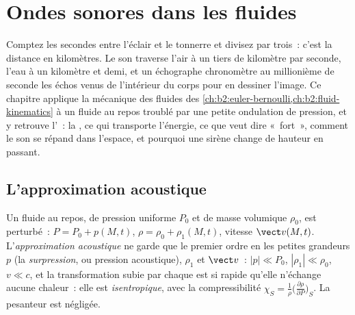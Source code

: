 \chapter{Ondes sonores dans les fluides}\label{ch:b2:sound-waves}

Comptez les secondes entre l'éclair et le tonnerre et divisez par
trois~: c'est la distance en kilomètres. Le son traverse l'air à un
tiers de kilomètre par seconde, l'eau à un kilomètre et demi, et
un échographe chronomètre au millionième de seconde les échos venus de l'intérieur du corps
pour en dessiner l'image. Ce chapitre applique la
mécanique des fluides des \cref{ch:b2:euler-bernoulli,ch:b2:fluid-kinematics}
à un fluide au repos troublé par une petite ondulation de pression, et y retrouve
l'~: la , ce qui transporte
l'énergie, ce que veut dire «~fort~», comment le son se répand dans l'espace, et pourquoi une sirène
change de hauteur en passant.

\section{L'approximation acoustique}

\begin{definition}\label{def:b2:sound-waves:approximation}
Un fluide au repos, de pression uniforme $P_0$ et de masse volumique $\rho_0$, est
perturbé~: $P = P_0 + p(M, t)$, $\rho = \rho_0 + \rho_1(M, t)$, vitesse
$\vect v(M, t)$. L'\emph{approximation acoustique} ne garde que le premier
ordre en les petites grandeurs $p$ (la \emph{surpression}, ou pression
acoustique), $\rho_1$ et $\vect v$~: $|p| \ll P_0$, $|\rho_1| \ll \rho_0$, $v \ll c$,
et la transformation subie par chaque  est si rapide
qu'elle n'échange aucune chaleur~: elle est \emph{isentropique}, avec la
compressibilité $\chi_S = \frac1\rho\bigl(\frac{\partial\rho}{\partial P}\bigr)_S$.
La pesanteur est négligée.
\end{definition}

